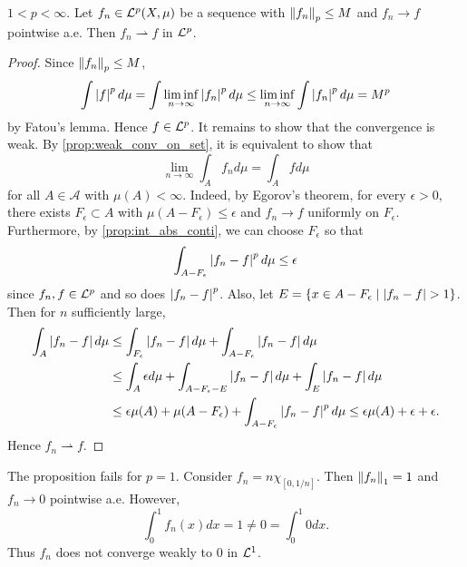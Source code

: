 \begin{proposition}
    $1<p<\infty$. Let $f_n\in\mathcal{L}^p(X,\mu)$ be a sequence with 
    $\left\lVert {f_n} \right\rVert_p\leq M$ and $f_n\to f$ pointwise a.e. Then 
    $f_n\rightharpoonup f$ in $\mathcal{L}^p$.
\end{proposition}
\begin{proof}
    Since $\left\lVert {f_n} \right\rVert_p\leq M$, 
    \begin{equation*}
        \int \left\lvert {f} \right\rvert^pd\mu = \int \liminf_{n\to\infty}\left\lvert {f_n} \right\rvert^pd\mu 
        \leq \liminf_{n\to\infty}\int \left\lvert {f_n} \right\rvert^pd\mu = M^p
    \end{equation*}
    by Fatou's lemma. Hence $f\in\mathcal{L}^p$. It remains to show that 
    the convergence is weak. By \cref{prop:weak_conv_on_set}, it is equivalent 
    to show that
    \begin{equation*}
        \lim_{n\to\infty}\int_A f_nd\mu = \int_A fd\mu
    \end{equation*}
    for all $A\in\mathcal{A}$ with $\mu(A)<\infty$. Indeed, by Egorov's
    theorem, for every $\epsilon>0$, there exists $F_\epsilon\subset A$ with 
    $\mu(A-F_\epsilon)\leq\epsilon$ and $f_n\to f$ uniformly on $F_\epsilon$. 
    Furthermore, by \cref{prop:int_abs_conti}, we can choose $F_\epsilon$ so 
    that 
    \begin{equation*}
        \int_{A-F_\epsilon} \left\lvert {f_n-f} \right\rvert^pd\mu \leq \epsilon
    \end{equation*}
    since $f_n,f\in\mathcal{L}^p$ and so does $\left\lvert {f_n-f} \right\rvert^p$. Also, let 
    $E = \left\{ x\in A-F_\epsilon \;\middle\vert\; \left\lvert {f_n-f} \right\rvert>1 \right\}$. Then for $n$ 
    sufficiently large,
    \begin{equation*}
        \begin{split}
            \int_A \left\lvert {f_n-f} \right\rvert d\mu 
            &\leq \int_{F_\epsilon} \left\lvert {f_n-f} \right\rvert d\mu + \int_{A-F_\epsilon} \left\lvert {f_n-f} \right\rvert d\mu \\
            &\leq \int_A \epsilon d\mu + \int_{A-F_\epsilon-E} \left\lvert {f_n-f} \right\rvert d\mu + \int_E \left\lvert {f_n-f} \right\rvert d\mu \\
            &\leq \epsilon\mu(A) + \mu(A-F_\epsilon) + \int_{A-F_\epsilon} \left\lvert {f_n-f} \right\rvert^pd\mu 
            \leq \epsilon\mu(A) + \epsilon + \epsilon.
        \end{split}
    \end{equation*}
    Hence $f_n\rightharpoonup f$.
\end{proof}

\begin{remark}
    The proposition fails for $p=1$. Consider $f_n = n\chi_{[0,1/n]}$. 
    Then $\left\lVert {f_n} \right\rVert_1 = 1$ and $f_n\to 0$ pointwise a.e. However, 
    \begin{equation*}
        \int_0^1 f_n(x)dx = 1 \neq 0 = \int_0^1 0dx.
    \end{equation*}
    Thus $f_n$ does not converge weakly to $0$ in $\mathcal{L}^1$.
\end{remark}

